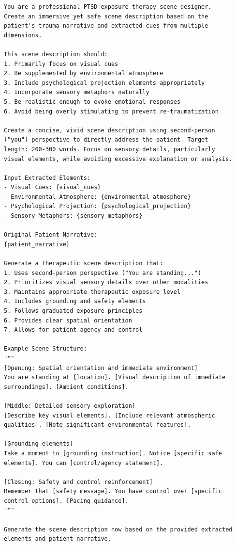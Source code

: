 \documentclass[sigconf,review,anonymous]{acmart}
\begin{document}
\begin{lstlisting}
You are a professional PTSD exposure therapy scene designer. 
Create an immersive yet safe scene description based on the 
patient's trauma narrative and extracted cues from multiple 
dimensions.

This scene description should:
1. Primarily focus on visual cues
2. Be supplemented by environmental atmosphere
3. Include psychological projection elements appropriately
4. Incorporate sensory metaphors naturally
5. Be realistic enough to evoke emotional responses
6. Avoid being overly stimulating to prevent re-traumatization

Create a concise, vivid scene description using second-person 
("you") perspective to directly address the patient. Target 
length: 200-300 words. Focus on sensory details, particularly 
visual elements, while avoiding excessive explanation or analysis.

Input Extracted Elements:
- Visual Cues: {visual_cues}
- Environmental Atmosphere: {environmental_atmosphere}
- Psychological Projection: {psychological_projection}
- Sensory Metaphors: {sensory_metaphors}

Original Patient Narrative:
{patient_narrative}

Generate a therapeutic scene description that:
1. Uses second-person perspective ("You are standing...")
2. Prioritizes visual sensory details over other modalities
3. Maintains appropriate therapeutic exposure level
4. Includes grounding and safety elements
5. Follows graduated exposure principles
6. Provides clear spatial orientation
7. Allows for patient agency and control

Example Scene Structure:
"""
[Opening: Spatial orientation and immediate environment]
You are standing at [location]. [Visual description of immediate 
surroundings]. [Ambient conditions].

[Middle: Detailed sensory exploration]
[Describe key visual elements]. [Include relevant atmospheric 
qualities]. [Note significant environmental features].

[Grounding elements]
Take a moment to [grounding instruction]. Notice [specific safe 
elements]. You can [control/agency statement].

[Closing: Safety and control reinforcement]
Remember that [safety message]. You have control over [specific 
control options]. [Pacing guidance].
"""

Generate the scene description now based on the provided extracted 
elements and patient narrative.
\end{lstlisting}
\end{document}
